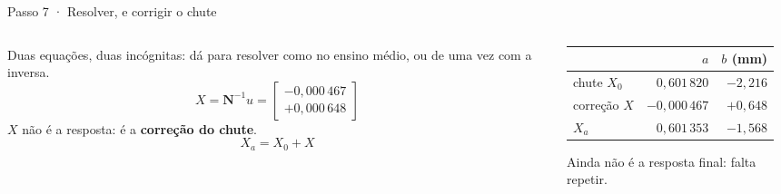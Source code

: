 \documentclass[aspectratio=169,11pt]{beamer}
\newcommand{\bnum}[1]{\textbf{\textcolor{mTeal}{#1}}}
\newcommand{\matN}{\mathbf{N}}
\begin{document}
\begin{frame}{Passo 7 · Resolver, e corrigir o chute}
  \begin{columns}[T]
    \begin{column}{0.50\textwidth}
      Duas equações, duas incógnitas: dá para resolver como no ensino médio,
      ou de uma vez com a inversa.
      \[ X = \matN^{-1}u = \begin{bmatrix} -0{,}000\,467 \\ +0{,}000\,648 \end{bmatrix} \]
      \medskip
      $X$ não é a resposta: é a \bnum{correção do chute}.
      \[ X_a = X_0 + X \]
    \end{column}
    \begin{column}{0.46\textwidth}
      \centering
      \small
      \renewcommand{\arraystretch}{1.3}
      \begin{tabular}{lrr}
        \toprule
        & $a$ & $b$ (mm) \\
        \midrule
        chute $X_0$   & $0{,}601\,820$ & $-2{,}216$ \\
        correção $X$  & $-0{,}000\,467$ & $+0{,}648$ \\
        \midrule
        $X_a$         & \bnum{$0{,}601\,353$} & \bnum{$-1{,}568$} \\
        \bottomrule
      \end{tabular}
      \medskip

      {\scriptsize\textcolor{mStoneMid}{Ainda não é a resposta final: falta repetir.}}
    \end{column}
  \end{columns}
\end{frame}
\end{document}
